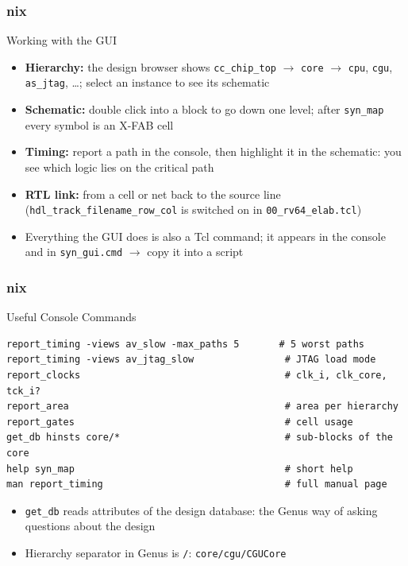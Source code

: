 \documentclass{beamer}
\newcommand{\astitle}{nix}
\newcommand{\assubtitle}{nix}
\newcommand{\cmd}[1]{\texttt{#1}}
\begin{document}
\renewcommand{\assubtitle}{Working with the GUI}
\begin{frame}
\frametitle{\astitle}
\begin{block}{\assubtitle}
  \footnotesize
  \begin{itemize}
    \item \textbf{Hierarchy:} the design browser shows \cmd{cc\_chip\_top}
      $\rightarrow$ \cmd{core} $\rightarrow$ \cmd{cpu}, \cmd{cgu}, \cmd{as\_jtag}, \dots;
      select an instance to see its schematic
    \item \textbf{Schematic:} double click into a block to go down one level;
      after \cmd{syn\_map} every symbol is an X-FAB cell
    \item \textbf{Timing:} report a path in the console, then highlight it in
      the schematic: you see which logic lies on the critical path
    \item \textbf{RTL link:} from a cell or net back to the source line
      (\cmd{hdl\_track\_filename\_row\_col} is switched on in
      \cmd{00\_rv64\_elab.tcl})
    \item Everything the GUI does is also a Tcl command; it appears in the
      console and in \cmd{syn\_gui.cmd} $\rightarrow$ copy it into a script
  \end{itemize}
\end{block}
\end{frame}

\renewcommand{\assubtitle}{Useful Console Commands}
\begin{frame}[fragile]
\frametitle{\astitle}
\begin{block}{\assubtitle}
\begin{lstlisting}[style=sh]
report_timing -views av_slow -max_paths 5       # 5 worst paths
report_timing -views av_jtag_slow                # JTAG load mode
report_clocks                                    # clk_i, clk_core, tck_i?
report_area                                      # area per hierarchy
report_gates                                     # cell usage
get_db hinsts core/*                             # sub-blocks of the core
help syn_map                                     # short help
man report_timing                                # full manual page
\end{lstlisting}
  \begin{itemize}
    \item \cmd{get\_db} reads attributes of the design database: the
      Genus way of asking questions about the design
    \item Hierarchy separator in Genus is \cmd{/}: \cmd{core/cgu/CGUCore}
  \end{itemize}
\end{block}
\end{frame}
\end{document}

